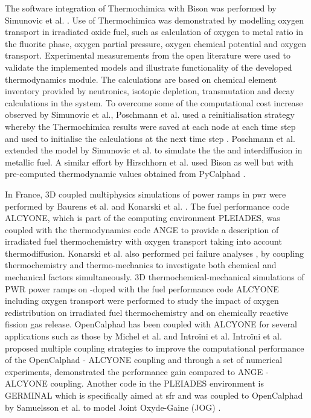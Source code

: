 	The software integration of Thermochimica with Bison was performed by Simunovic et al. \cite{Simunovic:2020aa}. Use of Thermochimica was demonstrated by modelling oxygen transport in irradiated  oxide fuel, such as calculation of oxygen to metal ratio in the fluorite phase, oxygen partial pressure, oxygen chemical potential and oxygen transport. Experimental measurements from the open literature were used to validate the implemented models and illustrate functionality of the developed thermodynamics module. The calculations are based on chemical element inventory provided by neutronics, isotopic depletion, transmutation and decay calculations in the \cite{SCALE05} system. To overcome some of the computational cost increase observed by Simunovic et al., Poschmann et al. used a reinitialisation strategy whereby the Thermochimica results were saved at each node at each time step and used to initialise the calculations at the next time step \cite{Poschmann:2019aa}. Poschmann et al. \cite{Poschmann:2021aa} extended the model by  Simunovic et al. to simulate the the  and  interdiffusion in  metallic fuel. A similar effort by Hirschhorn et al. used Bison as well but with pre-computed thermodynamic values obtained from PyCalphad \cite{Hirschhorn:2021aa}. 

	In France, 3D coupled multiphysics simulations of power ramps in \gls{pwr} were performed by Baurens et al. \cite{Baurens:2014aa} and  Konarski et al. \cite{KONARSKI2019104}. The fuel performance code {ALCYONE}, which is part of the computing environment {PLEIADES}, was coupled with the thermodynamics code {ANGE} to provide a description of irradiated fuel thermochemistry with oxygen transport taking into account thermodiffusion. Konarski et al. also performed \gls{pci} failure analyses \cite{Piro:2020aa}, by coupling thermochemistry and thermo-mechanics to investigate both chemical and mechanical factors simultaneously. 3D thermochemical-mechanical simulations of PWR power ramps on -doped  with the fuel performance code {ALCYONE} including oxygen transport were performed to study the impact of oxygen redistribution on irradiated fuel thermochemistry and on chemically reactive fission gas release. OpenCalphad has been coupled with ALCYONE for several applications such as those by Michel et al. \cite{Michel:2013aa} and Intro\"{i}ni et al. Intro\"{i}ni et al. proposed multiple coupling strategies to improve the computational performance of the OpenCalphad - ALCYONE coupling and through a set of numerical experiments, demonstrated the performance gain compared to ANGE - ALCYONE coupling. Another code in the PLEIADES environment is GERMINAL which is specifically aimed at \gls{sfr} and was coupled to OpenCalphad by Samuelsson et al. \cite{Samuelsson-Karl:2020aa} to model Joint Oxyde-Gaine (JOG) \cite{Gueneau:2020aa}.
	
